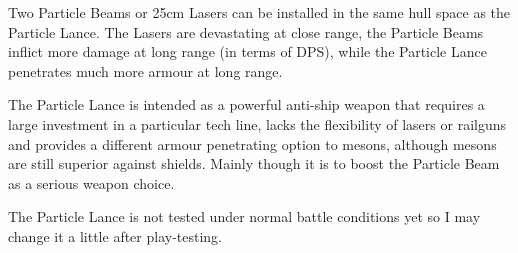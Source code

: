 \documentclass[../../Aurora C# unofficial manual.tex]{subfiles}
\begin{document}
	Two Particle Beams or 25cm Lasers can be installed in the same hull space as the Particle Lance. The Lasers are devastating at close range, the Particle Beams inflict more damage at long range (in terms of DPS), while the Particle Lance penetrates much more armour at long range.
	
	The Particle Lance is intended as a powerful anti-ship weapon that requires a large investment in a particular tech line, lacks the flexibility of lasers or railguns and provides a different armour penetrating option to mesons, although mesons are still superior against shields. Mainly though it is to boost the Particle Beam as a serious weapon choice.
	
	The Particle Lance is not tested under normal battle conditions yet so I may change it a little after play-testing.
\end{document}
